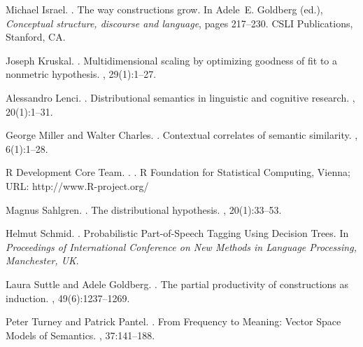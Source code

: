 \documentclass[11pt]{article}
\begin{document}
\begin{thebibliography}{}
Michael Israel.
.
\newblock The way constructions grow.
\newblock In Adele~E. Goldberg (ed.), {\em Conceptual structure, discourse and language}, pages 217--230.
\newblock CSLI Publications, Stanford, CA.

Joseph Kruskal.
.
\newblock Multidimensional scaling by optimizing goodness of fit to a nonmetric hypothesis.
, 29(1):1--27.

Alessandro Lenci.
.
\newblock Distributional semantics in linguistic and cognitive research.
, 20(1):1--31.

George Miller and Walter Charles.
.
\newblock Contextual correlates of semantic similarity.
, 6(1):1--28.

{R Development Core Team}.
.
.
\newblock R Foundation for Statistical Computing, Vienna; URL: http://www.R-project.org/

Magnus Sahlgren.
.
\newblock The distributional hypothesis.
, 20(1):33--53.

Helmut Schmid.
.
\newblock Probabilistic Part-of-Speech Tagging Using Decision Trees.
\newblock In {\em Proceedings of International Conference on New Methods in Language Processing, Manchester, UK}.

Laura Suttle and Adele Goldberg.
.
\newblock The partial productivity of constructions as induction.
, 49(6):1237--1269.

Peter Turney and Patrick Pantel.
.
\newblock From Frequency to Meaning: Vector Space Models of Semantics.
, 37:141--188.

\end{thebibliography}
\end{document}
